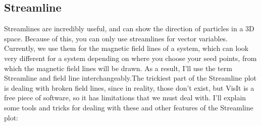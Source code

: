 \documentclass[english]{article}
\begin{document}
    \subsection{Streamline}
    Streamlines are incredibly useful, and can show the direction of particles in a 3D space. Because of this,
    you can only use streamlines for vector variables. Currently, we use them for the magnetic field lines of 
    a system, which can look very different for a system depending on where you choose your seed points, from
    which the magnetic field lines will be drawn. As a result, I'll use the term Streamline and field line 
    interchangeably.The trickiest part of the Streamline plot is dealing with broken field lines, since in 
    reality, those don't exist, but VisIt is a free piece of software, so it has limitations that we must deal 
    with. I'll explain some tools and tricks for dealing with these and other features of the Streamline plot:
\end{document}
